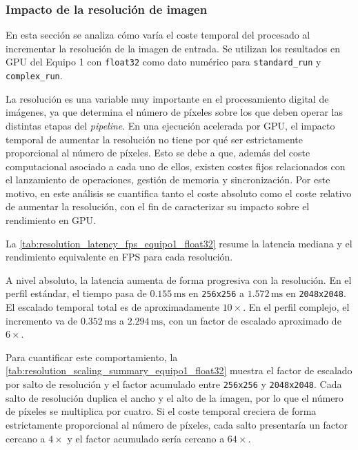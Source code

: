 
\newpage

\subsubsection{Impacto de la resolución de imagen} \label{subsubsec:resolution_impact}

En esta sección se analiza cómo varía el coste temporal del procesado al
incrementar la resolución de la imagen de entrada. Se utilizan los resultados 
en GPU del Equipo 1 con \texttt{float32} como dato numérico para \texttt{standard\_run} y
\texttt{complex\_run}.

La resolución es una variable muy importante en el procesamiento digital de imágenes, ya que 
determina el número de píxeles sobre los que deben operar las distintas etapas 
del \textit{pipeline}. En una ejecución acelerada por GPU, el impacto temporal 
de aumentar la resolución no tiene por qué ser estrictamente proporcional al número de píxeles.
Esto se debe a que, además del coste computacional asociado a cada uno de ellos, existen costes fijos relacionados con el lanzamiento
de operaciones, gestión de memoria y sincronización. Por este motivo, en este análisis se cuantifica tanto el coste 
absoluto como el coste relativo de aumentar la resolución, con el fin de caracterizar su impacto sobre el rendimiento en GPU.

La \autoref{tab:resolution_latency_fps_equipo1_float32} resume la latencia mediana y el
rendimiento equivalente en FPS para cada resolución.



A nivel absoluto, la latencia aumenta de forma progresiva con la resolución. En el perfil estándar, 
el tiempo pasa de \(0.155\,\mathrm{ms}\) en \texttt{256x256} a \(1.572\,\mathrm{ms}\) en \texttt{2048x2048}. El escalado temporal
total es de aproximadamente \(10\times\). En el perfil complejo, el incremento va de \(0.352\,\mathrm{ms}\) a \(2.294\,\mathrm{ms}\), 
con un factor de escalado aproximado de \(6\times\).

Para cuantificar este comportamiento, la
\autoref{tab:resolution_scaling_summary_equipo1_float32} muestra el factor de escalado
por salto de resolución y el factor acumulado entre \texttt{256x256} y
\texttt{2048x2048}. Cada salto de resolución duplica el ancho y el alto de la imagen, por lo 
que el número de píxeles se multiplica por cuatro. Si el coste temporal creciera de forma estrictamente 
proporcional al número de píxeles, cada salto presentaría un factor cercano a \(4\times\) y el factor acumulado sería cercano a \(64\times\).

